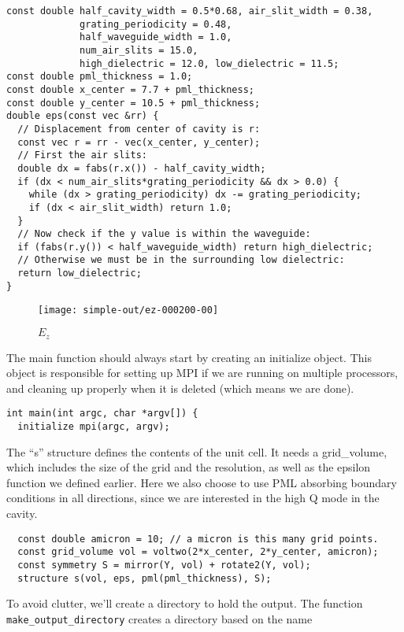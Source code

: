 \begin{verbatim}
const double half_cavity_width = 0.5*0.68, air_slit_width = 0.38,
             grating_periodicity = 0.48,
             half_waveguide_width = 1.0,
             num_air_slits = 15.0,
             high_dielectric = 12.0, low_dielectric = 11.5;
const double pml_thickness = 1.0;
const double x_center = 7.7 + pml_thickness;
const double y_center = 10.5 + pml_thickness;
double eps(const vec &rr) {
  // Displacement from center of cavity is r:
  const vec r = rr - vec(x_center, y_center);
  // First the air slits:
  double dx = fabs(r.x()) - half_cavity_width;
  if (dx < num_air_slits*grating_periodicity && dx > 0.0) {
    while (dx > grating_periodicity) dx -= grating_periodicity;
    if (dx < air_slit_width) return 1.0;
  }
  // Now check if the y value is within the waveguide:
  if (fabs(r.y()) < half_waveguide_width) return high_dielectric;
  // Otherwise we must be in the surrounding low dielectric:
  return low_dielectric;
}
\end{verbatim}
\begin{figure}
\label{simple_figure}
\caption{$E_z$}
\begin{center}
\texttt{[image: simple-out/ez-000200-00]}
\end{center}
\end{figure}
The main function should always start by creating an initialize object.
This object is responsible for setting up MPI if we are running on multiple
processors, and cleaning up properly when it is deleted (which means we are
done).
\begin{verbatim}
int main(int argc, char *argv[]) {
  initialize mpi(argc, argv);
\end{verbatim}
The ``s'' structure defines the contents of the unit cell.  It needs a
grid_volume, which includes the size of the grid and the resolution, as well as
the epsilon function we defined earlier.  Here we also choose to use PML
absorbing boundary conditions in all directions, since we are interested in
the high Q mode in the cavity.
\begin{verbatim}
  const double amicron = 10; // a micron is this many grid points.
  const grid_volume vol = voltwo(2*x_center, 2*y_center, amicron);
  const symmetry S = mirror(Y, vol) + rotate2(Y, vol);
  structure s(vol, eps, pml(pml_thickness), S);
\end{verbatim}
To avoid clutter, we'll create a directory to hold the output.  The
function \verb!make_output_directory! creates a directory based on the name
